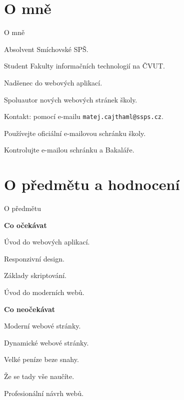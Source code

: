\documentclass[aspectratio=169]{beamer}
\begin{document}
\section{O mně}

\begin{frame}{O mně}
    \begin{cardTiny}
        Absolvent Smíchovské SPŠ.
        
        Student Fakulty informačních technologií na ČVUT.

        Nadšenec do webových aplikací.

        Spoluautor nových webových stránek školy.
    \end{cardTiny}
    \begin{cardTiny}
        Kontakt: pomocí e-mailu \texttt{matej.cajthaml@ssps.cz}.

        Používejte oficiální e-mailovou schránku školy.

        Kontrolujte e-mailou schránku a Bakaláře.
    \end{cardTiny}
\end{frame}



\section{O předmětu a hodnocení}

\begin{frame}{O předmětu}
    \begin{multicols}{2}
        \centering
        
        \begin{cardTiny}
            \textbf{Co očekávat}
        
            \begin{flushleft}
            Úvod do webových aplikací.
            
            Responzivní design.

            Základy skriptování.
        
            Úvod do moderních webů.
            \end{flushleft}
        \end{cardTiny}
        
        \begin{cardTiny}
            \textbf{Co neočekávat}
            
            \begin{flushleft}
            Moderní webové stránky.

            Dynamické webové stránky.
            
            Velké peníze beze snahy.

            Že se tady vše naučíte.

            Profesionální návrh webů.
            \end{flushleft}
        \end{cardTiny}
    \end{multicols}
\end{frame}
\end{document}
